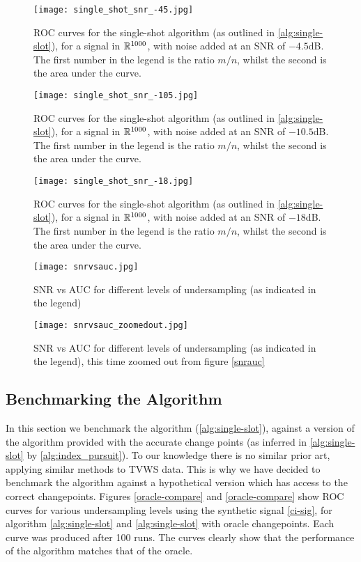 \begin{figure}[h]
\centering
\texttt{[image: single\_shot\_snr\_-45.jpg]}
\caption{ROC curves for the single-shot algorithm (as outlined in \ref{alg:single-slot}), for a signal in \({\mathbb{R}}^{1000}\), with noise added at an SNR of \(-4.5\)dB. The first number in the legend is the ratio \(m/n\), whilst the second is the area under the curve.}
\label{different_k_4.5}
\end{figure}

\begin{figure}[h]
\centering
\texttt{[image: single\_shot\_snr\_-105.jpg]}
\caption{ROC curves for the single-shot algorithm (as outlined in \ref{alg:single-slot}), for a signal in \({\mathbb{R}}^{1000}\), with noise added at an SNR of \(-10.5\)dB. The first number in the legend is the ratio \(m/n\), whilst the second is the area under the curve.}
\label{different_k_10.5}
\end{figure}

\begin{figure}[h]
\centering
\texttt{[image: single\_shot\_snr\_-18.jpg]}
\caption{ROC curves for the single-shot algorithm (as outlined in \ref{alg:single-slot}), for a signal in \({\mathbb{R}}^{1000}\), with noise added at an SNR of \(-18\)dB. The first number in the legend is the ratio \(m/n\), whilst the second is the area under the curve.}
\label{different_k_18}
\end{figure}

\begin{figure}[h]
\centering
\texttt{[image: snrvsauc.jpg]}
\caption{SNR vs AUC for different levels of undersampling (as indicated in the legend)}
\label{snrauc}
\end{figure}

\begin{figure}[h]
\centering
\texttt{[image: snrvsauc\_zoomedout.jpg]}
\caption{SNR vs AUC for different levels of undersampling (as indicated in the legend), this time zoomed out from figure \eqref{snrauc}}
\label{snrauc_pan}
\end{figure}

\clearpage

\subsection{Benchmarking the Algorithm}
In this section we benchmark the algorithm (\ref{alg:single-slot}), against a version of the algorithm provided with the accurate change points (as inferred in \ref{alg:single-slot} by \ref{alg:index_pursuit}). To our knowledge there is no similar prior art, applying similar methods to TVWS data. This is why we have decided to benchmark the algorithm against a hypothetical version which has access to the correct changepoints. Figures \ref{oracle-compare} and \ref{oracle-compare} show ROC curves for various undersampling levels using  the synthetic signal \ref{ci-sig}, for algorithm \ref{alg:single-slot} and \ref{alg:single-slot} with oracle changepoints. Each curve was produced after 100 runs. The curves clearly show that the performance of the algorithm matches that of the oracle.

